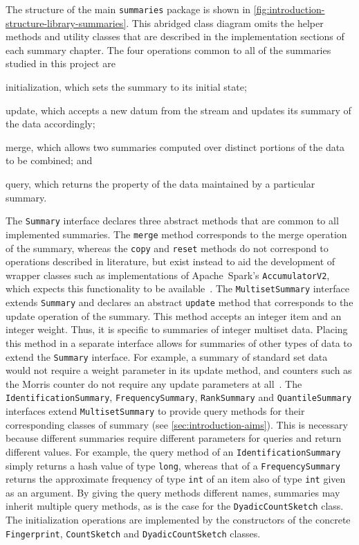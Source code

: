 The structure of the main \lstinline{summaries} package is shown in \cref{fig:introduction-structure-library-summaries}.
This abridged class diagram omits the helper methods and utility classes that are described in the implementation sections of each summary chapter.
The four operations common to all of the summaries studied in this project are
\begin{enumerate*}
  \item initialization, which sets the summary to its initial state;
  \item update, which accepts a new datum from the stream and updates its summary of the data accordingly;
  \item merge, which allows two summaries computed over distinct portions of the data to be combined; and
  \item query, which returns the property of the data maintained by a particular summary.
\end{enumerate*}
The \lstinline{Summary} interface declares three abstract methods that are common to all implemented summaries.
The \lstinline{merge} method corresponds to the merge operation of the summary, whereas the \lstinline{copy} and \lstinline{reset} methods do not correspond to operations described in literature, but exist instead to aid the development of wrapper classes such as implementations of Apache~Spark's \lstinline{AccumulatorV2}, which expects this functionality to be available~\citep{tasf14}.
The \lstinline{MultisetSummary} interface extends \lstinline{Summary} and declares an abstract \lstinline{update} method that corresponds to the update operation of the summary.
This method accepts an integer item and an integer weight.
Thus, it is specific to summaries of integer multiset data.
Placing this method in a separate interface allows for summaries of other types of data to extend the \lstinline{Summary} interface.
For example, a summary of standard set data would not require a weight parameter in its update method, and counters such as the Morris counter do not require any update parameters at all~\citep{cormode20,morris78}.
The \lstinline{IdentificationSummary}, \lstinline{FrequencySummary}, \lstinline{RankSummary} and \lstinline{QuantileSummary} interfaces extend \lstinline{MultisetSummary} to provide query methods for their corresponding classes of summary (see \cref{sec:introduction-aims}).
This is necessary because different summaries require different parameters for queries and return different values.
For example, the query method of an \lstinline{IdentificationSummary} simply returns a hash value of type \lstinline{long}, whereas that of a \lstinline{FrequencySummary} returns the approximate frequency of type \lstinline{int} of an item also of type \lstinline{int} given as an argument.
By giving the query methods different names, summaries may inherit multiple query methods, as is the case for the \lstinline{DyadicCountSketch} class.
The initialization operations are implemented by the constructors of the concrete \lstinline{Fingerprint}, \lstinline{CountSketch} and \lstinline{DyadicCountSketch} classes.

